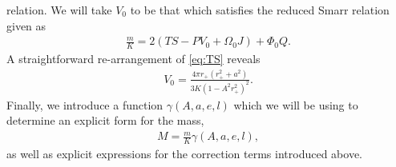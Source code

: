 \documentclass[
twoside,
openright,
frontopenright
]{dmathesis}
\begin{document}
relation. We will take $V_0$ to be that which satisfies the reduced Smarr
relation given as
\begin{align}\label{eq:Smarr0}
\frac{m}{K} = 2(TS-PV_0+\Omega_0 J)+\Phi_0 Q.
\end{align}
A straightforward re-arrangement of \cref{eq:TS} reveals
\begin{align}\label{eq:V0}
V_0 = \frac{4\pi r_+ (r_+^2+a^2)}{3 K (1-A^2 r_+^2)^2}.
\end{align}
Finally, we introduce a function $\gamma(A,a,e,l)$ which we will be using to
determine an explicit form for the mass,
\begin{align}\label{eq:defM}
M=\frac{m}{K} \gamma(A,a,e,l),
\end{align}
as well as explicit expressions for the correction terms introduced above.
\end{document}
